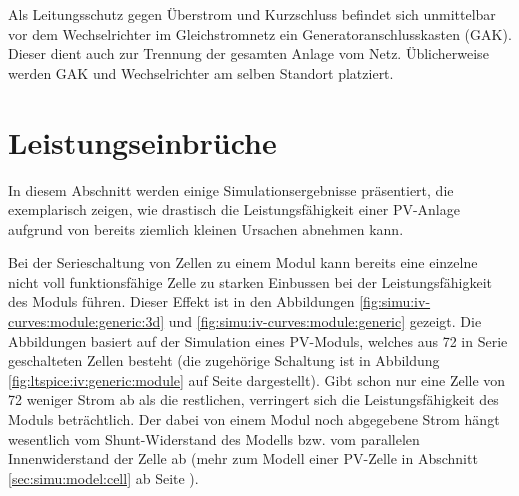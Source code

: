 Als Leitungsschutz gegen \"Uberstrom und Kurzschluss befindet sich unmittelbar
vor  dem   Wechselrichter  im  Gleichstromnetz   ein  Generatoranschlusskasten
(GAK). Dieser   dient   auch   zur    Trennung   der   gesamten   Anlage   vom
Netz. \"Ublicherweise  werden  GAK  und   Wechselrichter  am  selben  Standort
platziert.


\clearpage
\section{Leistungseinbr\"uche}
\label{sec:shadedCells}

In  diesem Abschnitt  werden einige  Simulationsergebnisse pr\"asentiert,  die
exemplarisch zeigen,  wie drastisch  die Leistungsf\"ahigkeit  einer PV-Anlage
aufgrund von bereits ziemlich kleinen Ursachen abnehmen kann.

Bei   der   Serieschaltung   von   Zellen  zu   einem   Modul   kann   bereits
eine    einzelne   nicht    voll    funktionsf\"ahige    Zelle   zu    starken
Einbussen   bei   der   Leistungsf\"ahigkeit   des   Moduls   f\"uhren\footnotemark. Dieser
Effekt  ist  in   den  Abbildungen  \ref{fig:simu:iv-curves:module:generic:3d}
und    \ref{fig:simu:iv-curves:module:generic}     gezeigt. Die    Abbildungen
basiert    auf   der    Simulation   eines    PV-Moduls,   welches    aus   72
in   Serie   geschalteten   Zellen   besteht   (die   zugeh\"orige   Schaltung
ist    in    Abbildung     \ref{fig:ltspice:iv:generic:module}    auf    Seite
\pageref{fig:ltspice:iv:generic:module}  dargestellt). Gibt   schon  nur  eine
Zelle  von  72 weniger  Strom  ab  als  die  restlichen, verringert  sich  die
Leistungsf\"ahigkeit des Moduls betr\"achtlich. Der dabei von einem Modul noch
abgegebene Strom h\"angt wesentlich vom  Shunt-Widerstand des Modells bzw. vom
parallelen Innenwiderstand  der Zelle  ab (mehr zum  Modell einer  PV-Zelle in
Abschnitt \ref{sec:simu:model:cell} ab Seite \pageref{sec:simu:model:cell}).


